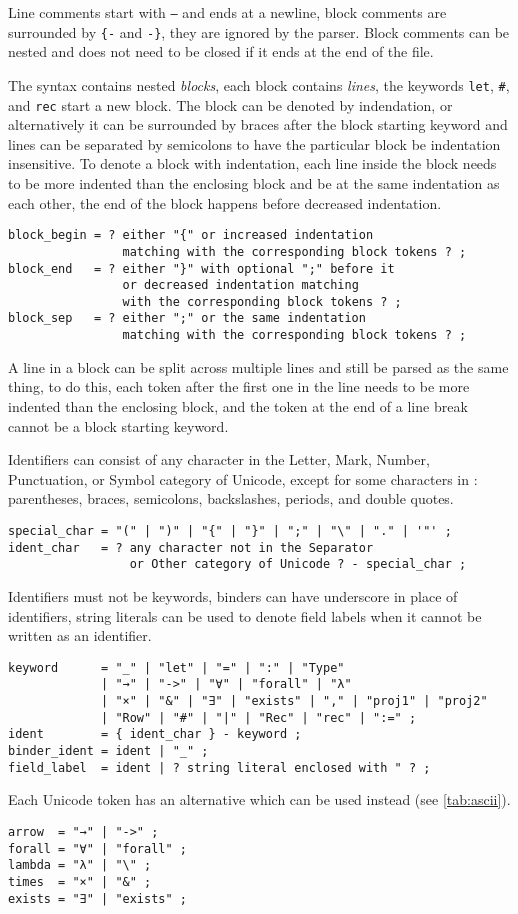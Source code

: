 Line comments start with \texttt{--} and ends at a newline, block comments are
surrounded by \texttt{\{-} and \texttt{-\}}, they are ignored by the parser.
Block comments can be nested and does not need to be closed if it ends at the
end of the file.

The syntax contains nested \emph{blocks}, each block contains \emph{lines}, the
keywords \texttt{let},
\texttt{#}, and \texttt{rec} start a new block. The block can be denoted by indendation, or
alternatively it can be surrounded by braces after the block starting keyword
and lines can be separated by semicolons to have the particular block be
indentation insensitive. To denote a block with indentation, each line inside
the block needs to be more indented than the enclosing block and be at the same
indentation as each other, the end of the block happens before decreased
indentation.
\begin{verbatim}
block_begin = ? either "{" or increased indentation
                matching with the corresponding block tokens ? ;
block_end   = ? either "}" with optional ";" before it
                or decreased indentation matching
                with the corresponding block tokens ? ;
block_sep   = ? either ";" or the same indentation
                matching with the corresponding block tokens ? ;
\end{verbatim}

A line in a block can be split across multiple lines and still be parsed as the
same thing, to do this, each token after the first one in the line needs to be
more indented than the enclosing block, and the token at the end of a line break
cannot be a block starting keyword.

Identifiers can consist of any character in the Letter, Mark, Number,
Punctuation, or Symbol category of Unicode, except for some characters in
: parentheses, braces, semicolons, backslashes, periods, and double
quotes.
\begin{verbatim}
special_char = "(" | ")" | "{" | "}" | ";" | "\" | "." | '"' ;
ident_char   = ? any character not in the Separator
                 or Other category of Unicode ? - special_char ;
\end{verbatim}
Identifiers must not be keywords, binders can have underscore in place of
identifiers, string literals can be used to denote field labels when it cannot
be written as an identifier.
\begin{verbatim}
keyword      = "_" | "let" | "=" | ":" | "Type"
             | "→" | "->" | "∀" | "forall" | "λ"
             | "×" | "&" | "∃" | "exists" | "," | "proj1" | "proj2"
             | "Row" | "#" | "|" | "Rec" | "rec" | ":=" ;
ident        = { ident_char } - keyword ;
binder_ident = ident | "_" ;
field_label  = ident | ? string literal enclosed with " ? ;
\end{verbatim}
Each Unicode token has an  alternative which can be used instead
(see \cref{tab:ascii}).
\begin{verbatim}
arrow  = "→" | "->" ;
forall = "∀" | "forall" ;
lambda = "λ" | "\" ;
times  = "×" | "&" ;
exists = "∃" | "exists" ;
\end{verbatim}

